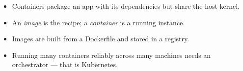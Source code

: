 \begin{recap}
\begin{itemize}
  \item Containers package an app with its dependencies but share the host kernel.
  \item An \emph{image} is the recipe; a \emph{container} is a running instance.
  \item Images are built from a Dockerfile and stored in a registry.
  \item Running many containers reliably across many machines needs an
        orchestrator --- that is Kubernetes.
\end{itemize}
\end{recap}
